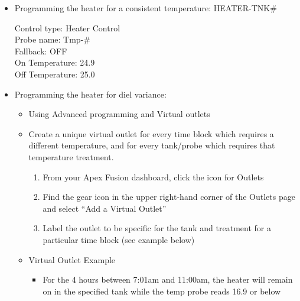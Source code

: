 \documentclass[
]{book}
\providecommand{\tightlist}{%
  \setlength{\itemsep}{0pt}\setlength{\parskip}{0pt}}
\begin{document}
\begin{itemize}
\item
  Programming the heater for a consistent temperature: HEATER-TNK\#

  Control type: Heater Control\\
  Probe name: Tmp-\#\\
  Fallback: OFF\\
  On Temperature: 24.9\\
  Off Temperature: 25.0
\item
  Programming the heater for diel variance:

  \begin{itemize}
  \tightlist
  \item
    Using Advanced programming and Virtual outlets
  \item
    Create a unique virtual outlet for every time block which requires a different temperature, and for every tank/probe which requires that temperature treatment.

    \begin{enumerate}
    \def\labelenumi{\arabic{enumi}.}
    \tightlist
    \item
      From your Apex Fusion dashboard, click the icon for Outlets
    \item
      Find the gear icon in the upper right-hand corner of the Outlets page and select ``Add a Virtual Outlet''
    \item
      Label the outlet to be specific for the tank and treatment for a particular time block (see example below)
    \end{enumerate}
  \item
    Virtual Outlet Example

    \begin{itemize}
    \tightlist
    \item
      For the 4 hours between 7:01am and 11:00am, the heater will remain on in the specified tank while the temp probe reads 16.9 or below
    \end{itemize}
  \end{itemize}


\end{itemize}
\end{document}
